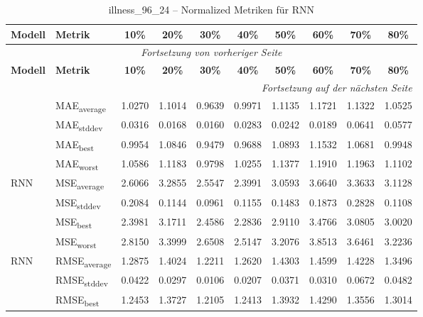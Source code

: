 {\small
\begin{longtable}{l l c c c c c c c c}
    \toprule
    \textbf{Modell} & \textbf{Metrik} & \textbf{10\%} & \textbf{20\%} & \textbf{30\%} & \textbf{40\%} & \textbf{50\%} & \textbf{60\%} & \textbf{70\%} & \textbf{80\%} \\
    \midrule
    \endfirsthead
    \multicolumn{10}{c}{\textit{Fortsetzung von vorheriger Seite}} \\
    \toprule
    \textbf{Modell} & \textbf{Metrik} & \textbf{10\%} & \textbf{20\%} & \textbf{30\%} & \textbf{40\%} & \textbf{50\%} & \textbf{60\%} & \textbf{70\%} & \textbf{80\%} \\
    \midrule
    \endhead
    \midrule
    \multicolumn{10}{r}{\textit{Fortsetzung auf der nächsten Seite}} \\
    \midrule
    \endfoot
    \bottomrule
    \caption{illness_96_24 -- Normalized Metriken für RNN}
    \label{tab:illness_96_24_normalized_rnn}
    \endlastfoot
\multirow{4}{*}{RNN} & MAE\textsubscript{average} & 1.0270 & 1.1014 & 0.9639 & 0.9971 & 1.1135 & 1.1721 & 1.1322 & 1.0525 \\
 & MAE\textsubscript{stddev} & 0.0316 & 0.0168 & 0.0160 & 0.0283 & 0.0242 & 0.0189 & 0.0641 & 0.0577 \\
 & MAE\textsubscript{best} & 0.9954 & 1.0846 & 0.9479 & 0.9688 & 1.0893 & 1.1532 & 1.0681 & 0.9948 \\
 & MAE\textsubscript{worst} & 1.0586 & 1.1183 & 0.9798 & 1.0255 & 1.1377 & 1.1910 & 1.1963 & 1.1102 \\
\cmidrule(lr){2-10}
\multirow{4}{*}{RNN} & MSE\textsubscript{average} & 2.6066 & 3.2855 & 2.5547 & 2.3991 & 3.0593 & 3.6640 & 3.3633 & 3.1128 \\
 & MSE\textsubscript{stddev} & 0.2084 & 0.1144 & 0.0961 & 0.1155 & 0.1483 & 0.1873 & 0.2828 & 0.1108 \\
 & MSE\textsubscript{best} & 2.3981 & 3.1711 & 2.4586 & 2.2836 & 2.9110 & 3.4766 & 3.0805 & 3.0020 \\
 & MSE\textsubscript{worst} & 2.8150 & 3.3999 & 2.6508 & 2.5147 & 3.2076 & 3.8513 & 3.6461 & 3.2236 \\
\cmidrule(lr){2-10}
\multirow{4}{*}{RNN} & RMSE\textsubscript{average} & 1.2875 & 1.4024 & 1.2211 & 1.2620 & 1.4303 & 1.4599 & 1.4228 & 1.3496 \\
 & RMSE\textsubscript{stddev} & 0.0422 & 0.0297 & 0.0106 & 0.0207 & 0.0371 & 0.0310 & 0.0672 & 0.0482 \\
 & RMSE\textsubscript{best} & 1.2453 & 1.3727 & 1.2105 & 1.2413 & 1.3932 & 1.4290 & 1.3556 & 1.3014 \\

\end{longtable}}
